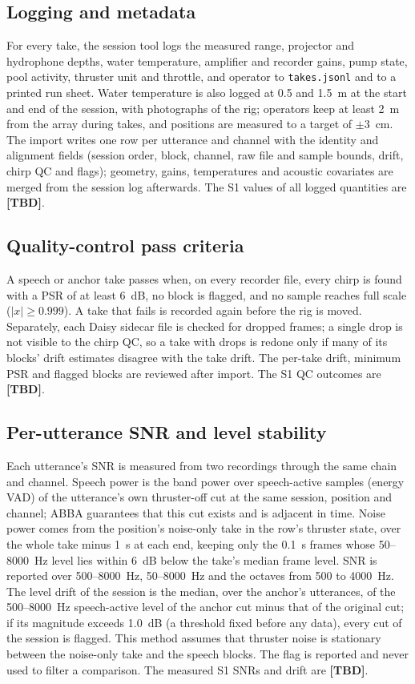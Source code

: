 \documentclass[conference]{IEEEtran}
\newcommand{\tbd}{\textbf{[TBD]}}
\begin{document}
\subsection{Logging and metadata}
\label{sec:logging}
For every take, the session tool logs the measured range, projector and hydrophone depths, water
temperature, amplifier and recorder gains, pump state, pool activity, thruster unit and throttle, and
operator to \texttt{takes.jsonl} and to a printed run sheet. Water temperature is also logged at 0.5
and 1.5~m at the start and end of the session, with photographs of the rig; operators keep at least 2~m
from the array during takes, and positions are measured to a target of $\pm3$~cm. The import writes
one row per utterance and channel with the identity and alignment fields (session order, block,
channel, raw file and sample bounds, drift, chirp QC and flags); geometry, gains, temperatures and
acoustic covariates are merged from the session log afterwards. The S1 values of all logged quantities
are \tbd.

\subsection{Quality-control pass criteria}
\label{sec:qc}
A speech or anchor take passes when, on every recorder file, every chirp is found with a PSR of at
least 6~dB, no block is flagged, and no sample reaches full scale ($|x| \ge 0.999$). A take that fails
is recorded again before the rig is moved. Separately, each Daisy sidecar file is checked for dropped
frames; a single drop is not visible to the chirp QC, so a take with drops is redone only if many of its
blocks' drift estimates disagree with the take drift. The
per-take drift, minimum PSR and flagged blocks are reviewed after import. The S1 QC outcomes are \tbd.

\subsection{Per-utterance SNR and level stability}
\label{sec:snr}
Each utterance's SNR is measured from two recordings through the same chain and channel. Speech power
is the band power over speech-active samples (energy VAD) of the utterance's own thruster-off cut at the
same session, position and channel; ABBA guarantees that this cut exists and is adjacent in time. Noise
power comes from the position's noise-only take in the row's thruster state, over the whole take minus
1~s at each end, keeping only the 0.1~s frames whose 50--8000~Hz level lies within 6~dB below the
take's median frame level. SNR is reported over 500--8000~Hz, 50--8000~Hz and the octaves from 500 to
4000~Hz. The level drift of the session is the median, over the anchor's utterances, of the
500--8000~Hz speech-active level of the anchor cut minus that of the original cut; if its magnitude
exceeds 1.0~dB (a threshold fixed before any data), every cut of the session is flagged. This method
assumes that thruster noise is stationary between the noise-only take and the speech blocks. The flag is
reported and never used to filter a comparison. The measured S1 SNRs and drift are \tbd.
\end{document}
